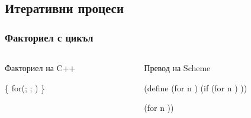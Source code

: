 \documentclass{beamer}
\begin{document}
\lstset{basicstyle=\ttfamily}

\subsection{Итеративни процеси}

\begin{frame}[fragile]
  \frametitle{Факториел с цикъл}

  \begin{overlayarea}{\textwidth}{.5\textheight}
  \begin{columns}[T,onlytextwidth]
    \begin{column}{.5\textwidth}
      Факториел на C++\\
\begin{semiverbatim}
 \{
  for(; ; )
\}
\end{semiverbatim}
    \end{column}
    \pause
    \begin{column}{.5\textwidth}
      Превод на Scheme\\
\begin{semiverbatim}
(define (for n  )
  (if 
      (for n  )
      ))

  (for n  ))
\end{semiverbatim}
    \end{column}
  \end{columns}
\end{overlayarea}
\end{frame}
\end{document}
